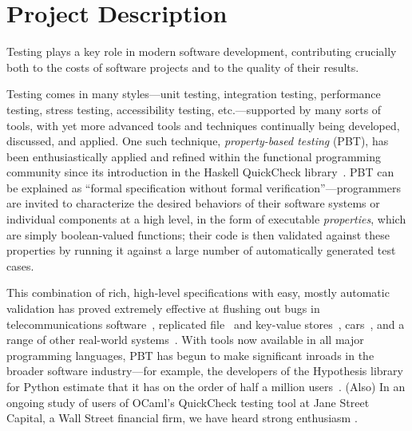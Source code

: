 \section{Project Description }

\iflater{}\fi

Testing plays a key role in modern software development,
contributing crucially both to the costs of software projects and to
the quality of their results.

Testing comes in many styles---unit testing, integration testing,
performance testing, stress testing, accessibility testing,
etc.---supported by many sorts of tools, with yet more advanced tools
and techniques continually being developed, discussed, and applied.
%
One such technique, {\em property-based testing} (PBT), has been
enthusiastically applied and refined within the functional programming
community since its introduction in the Haskell QuickCheck
library~\cite{ClaessenHughes00}.
%
PBT can be explained as ``formal specification without formal
verification''---programmers are invited to characterize the desired
behaviors of their software systems or individual components at a high
level, in the form of executable {\em properties}, which are simply
boolean-valued functions; their code is then validated against these
properties by running it against a large number of automatically
generated test cases.

This combination of rich, high-level specifications with easy, mostly
automatic validation has proved extremely effective at flushing out
bugs in telecommunications software~\cite{arts2006testing}, replicated
file~\cite{hughes2014mysteries} and key-value
stores~\cite{Bornholt2021}, cars~\cite{arts2015testing}, and a range
of other real-world systems~\cite{hughes2016experiences}.  With tools
now available in all major programming languages, PBT has
begun to make significant inroads in the broader software
industry---for example, the developers of the Hypothesis library for
Python estimate that it has on the order of half a million
users~\cite{ZacPersonalCommunication}.
%
(Also) In an ongoing study of users of OCaml's QuickCheck testing tool
at Jane Street Capital, a Wall Street financial firm, we have heard
strong enthusiasm .


